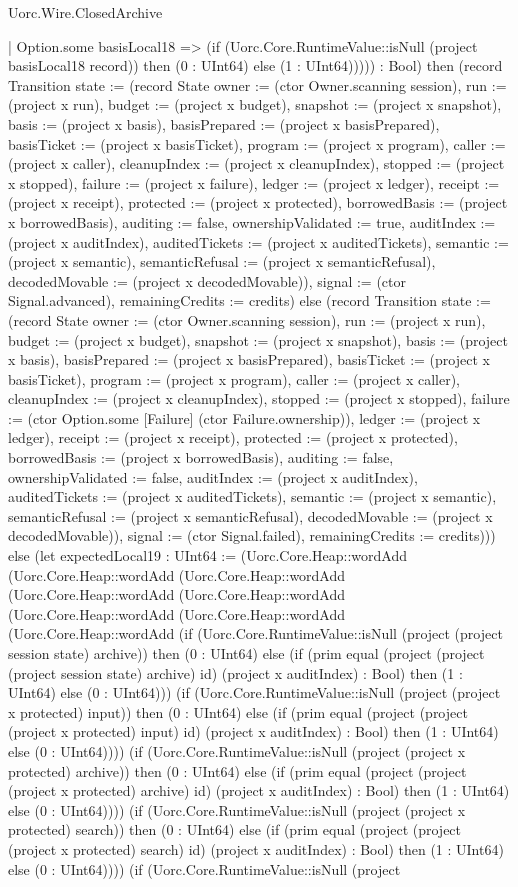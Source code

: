 \begin{lexlean}{Uorc.Wire.ClosedArchive}
\begin{semanticmodule}
{    | Option.some basisLocal18 => (if (Uorc.Core.RuntimeValue::isNull (project basisLocal18 record)) then (0 : UInt64) else (1 : UInt64))))) : Bool) then (record Transition {state := (record State {owner := (ctor Owner.scanning session), run := (project x run), budget := (project x budget), snapshot := (project x snapshot), basis := (project x basis), basisPrepared := (project x basisPrepared), basisTicket := (project x basisTicket), program := (project x program), caller := (project x caller), cleanupIndex := (project x cleanupIndex), stopped := (project x stopped), failure := (project x failure), ledger := (project x ledger), receipt := (project x receipt), protected := (project x protected), borrowedBasis := (project x borrowedBasis), auditing := false, ownershipValidated := true, auditIndex := (project x auditIndex), auditedTickets := (project x auditedTickets), semantic := (project x semantic), semanticRefusal := (project x semanticRefusal), decodedMovable := (project x decodedMovable)}), signal := (ctor Signal.advanced), remainingCredits := credits}) else (record Transition {state := (record State {owner := (ctor Owner.scanning session), run := (project x run), budget := (project x budget), snapshot := (project x snapshot), basis := (project x basis), basisPrepared := (project x basisPrepared), basisTicket := (project x basisTicket), program := (project x program), caller := (project x caller), cleanupIndex := (project x cleanupIndex), stopped := (project x stopped), failure := (ctor Option.some [Failure] (ctor Failure.ownership)), ledger := (project x ledger), receipt := (project x receipt), protected := (project x protected), borrowedBasis := (project x borrowedBasis), auditing := false, ownershipValidated := false, auditIndex := (project x auditIndex), auditedTickets := (project x auditedTickets), semantic := (project x semantic), semanticRefusal := (project x semanticRefusal), decodedMovable := (project x decodedMovable)}), signal := (ctor Signal.failed), remainingCredits := credits}))) else (let expectedLocal19 : UInt64 := (Uorc.Core.Heap::wordAdd (Uorc.Core.Heap::wordAdd (Uorc.Core.Heap::wordAdd (Uorc.Core.Heap::wordAdd (Uorc.Core.Heap::wordAdd (Uorc.Core.Heap::wordAdd (Uorc.Core.Heap::wordAdd (Uorc.Core.Heap::wordAdd (if (Uorc.Core.RuntimeValue::isNull (project (project session state) archive)) then (0 : UInt64) else (if (prim equal (project (project (project session state) archive) id) (project x auditIndex) : Bool) then (1 : UInt64) else (0 : UInt64))) (if (Uorc.Core.RuntimeValue::isNull (project (project x protected) input)) then (0 : UInt64) else (if (prim equal (project (project (project x protected) input) id) (project x auditIndex) : Bool) then (1 : UInt64) else (0 : UInt64)))) (if (Uorc.Core.RuntimeValue::isNull (project (project x protected) archive)) then (0 : UInt64) else (if (prim equal (project (project (project x protected) archive) id) (project x auditIndex) : Bool) then (1 : UInt64) else (0 : UInt64)))) (if (Uorc.Core.RuntimeValue::isNull (project (project x protected) search)) then (0 : UInt64) else (if (prim equal (project (project (project x protected) search) id) (project x auditIndex) : Bool) then (1 : UInt64) else (0 : UInt64)))) (if (Uorc.Core.RuntimeValue::isNull (project }
\end{semanticmodule}
\end{lexlean}

